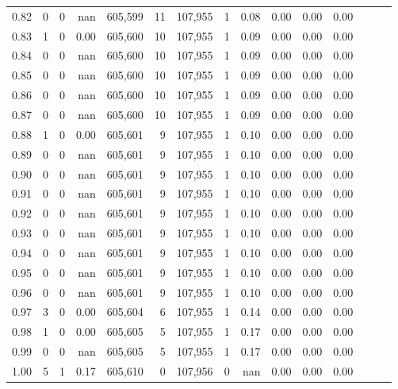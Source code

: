 \begin{tabular}{rrrrrrrrrrrrrrr}
0.82 &        0 &       0 &   nan &  605,599 &       11 &  107,955 &        1 &  0.08 &  0.00 &  0.00 &      0.00 \\
0.83 &        1 &       0 &  0.00 &  605,600 &       10 &  107,955 &        1 &  0.09 &  0.00 &  0.00 &      0.00 \\
0.84 &        0 &       0 &   nan &  605,600 &       10 &  107,955 &        1 &  0.09 &  0.00 &  0.00 &      0.00 \\
0.85 &        0 &       0 &   nan &  605,600 &       10 &  107,955 &        1 &  0.09 &  0.00 &  0.00 &      0.00 \\
0.86 &        0 &       0 &   nan &  605,600 &       10 &  107,955 &        1 &  0.09 &  0.00 &  0.00 &      0.00 \\
0.87 &        0 &       0 &   nan &  605,600 &       10 &  107,955 &        1 &  0.09 &  0.00 &  0.00 &      0.00 \\
0.88 &        1 &       0 &  0.00 &  605,601 &        9 &  107,955 &        1 &  0.10 &  0.00 &  0.00 &      0.00 \\
0.89 &        0 &       0 &   nan &  605,601 &        9 &  107,955 &        1 &  0.10 &  0.00 &  0.00 &      0.00 \\
0.90 &        0 &       0 &   nan &  605,601 &        9 &  107,955 &        1 &  0.10 &  0.00 &  0.00 &      0.00 \\
0.91 &        0 &       0 &   nan &  605,601 &        9 &  107,955 &        1 &  0.10 &  0.00 &  0.00 &      0.00 \\
0.92 &        0 &       0 &   nan &  605,601 &        9 &  107,955 &        1 &  0.10 &  0.00 &  0.00 &      0.00 \\
0.93 &        0 &       0 &   nan &  605,601 &        9 &  107,955 &        1 &  0.10 &  0.00 &  0.00 &      0.00 \\
0.94 &        0 &       0 &   nan &  605,601 &        9 &  107,955 &        1 &  0.10 &  0.00 &  0.00 &      0.00 \\
0.95 &        0 &       0 &   nan &  605,601 &        9 &  107,955 &        1 &  0.10 &  0.00 &  0.00 &      0.00 \\
0.96 &        0 &       0 &   nan &  605,601 &        9 &  107,955 &        1 &  0.10 &  0.00 &  0.00 &      0.00 \\
0.97 &        3 &       0 &  0.00 &  605,604 &        6 &  107,955 &        1 &  0.14 &  0.00 &  0.00 &      0.00 \\
0.98 &        1 &       0 &  0.00 &  605,605 &        5 &  107,955 &        1 &  0.17 &  0.00 &  0.00 &      0.00 \\
0.99 &        0 &       0 &   nan &  605,605 &        5 &  107,955 &        1 &  0.17 &  0.00 &  0.00 &      0.00 \\
1.00 &        5 &       1 &  0.17 &  605,610 &        0 &  107,956 &        0 &   nan &  0.00 &  0.00 &      0.00 \\
\bottomrule
\end{tabular}
